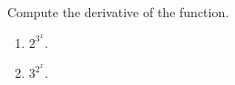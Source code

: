 Compute the derivative of the function.
\begin{enumerate}
\item $2^{3^x}$.
\item $3^{2^x}$.
\end{enumerate}
